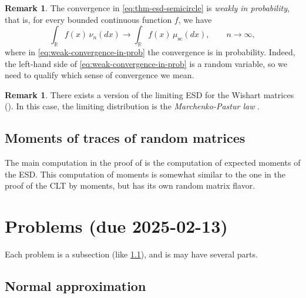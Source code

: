 \documentclass[letterpaper,11pt,oneside,reqno]{article}
\numberwithin{equation}{section}
\theoremstyle{definition}
\newtheorem{remark}[proposition]{Remark}
\begin{document}
\begin{remark}
	The convergence in \eqref{eq:thm-esd-semicircle} is
	\emph{weakly in probability}, that is,
	for every bounded continuous function $f$,
	we have
	\begin{equation}
		\label{eq:weak-convergence-in-prob}
		\int_{\mathbb{R}} f(x) \, \nu_n(dx) \longrightarrow \int_{\mathbb{R}} f(x) \, \mu_{\mathrm{sc}}(dx),\qquad  n\to\infty,
	\end{equation}
	where in \eqref{eq:weak-convergence-in-prob} the convergence is in probability.
	Indeed, the left-hand side of \eqref{eq:weak-convergence-in-prob}
	is a random variable, so we need to qualify which sense of convergence we mean.
\end{remark}

\begin{remark}
	There exists a version of the limiting
	ESD for the Wishart matrices
	().
	In this case, the limiting distribution is the
	\emph{Marchenko-Pastur law}
	\cite{MarchenkoPastur}.
\end{remark}

\subsection{Moments of traces of random matrices}

The main computation in the proof of
 is the computation of
expected moments of the ESD.
This computation of moments is somewhat similar
to the one in the proof of the CLT by moments,
but has its own random matrix flavor.












\appendix
\setcounter{section}{0}

\section{Problems (due 2025-02-13)}

Each problem is a subsection (like \ref{sub:normal-approximation}),
and is may have several parts.

\subsection{Normal approximation}
\label{sub:normal-approximation}
\end{document}
